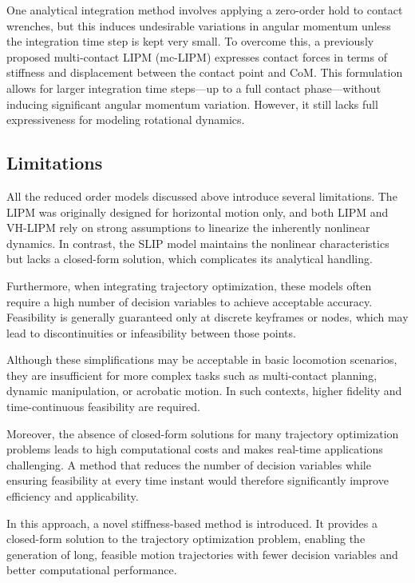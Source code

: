 \documentclass[main.tex]{subfiles}
\begin{document}
One analytical integration method involves applying a zero-order hold to contact wrenches, but this induces undesirable variations in angular momentum unless the integration time step is kept very small. To overcome this, a previously proposed multi-contact LIPM (mc-LIPM) expresses contact forces in terms of stiffness and displacement between the contact point and CoM. This formulation allows for larger integration time steps—up to a full contact phase—without inducing significant angular momentum variation. However, it still lacks full expressiveness for modeling rotational dynamics.



\subsection{Limitations}

All the reduced order models discussed above introduce several limitations. The LIPM was originally designed for horizontal motion only, and both LIPM and VH-LIPM rely on strong assumptions to linearize the inherently nonlinear dynamics. In contrast, the SLIP model maintains the nonlinear characteristics but lacks a closed-form solution, which complicates its analytical handling.

Furthermore, when integrating trajectory optimization, these models often require a high number of decision variables to achieve acceptable accuracy. Feasibility is generally guaranteed only at discrete keyframes or nodes, which may lead to discontinuities or infeasibility between those points.

Although these simplifications may be acceptable in basic locomotion scenarios, they are insufficient for more complex tasks such as multi-contact planning, dynamic manipulation, or acrobatic motion. In such contexts, higher fidelity and time-continuous feasibility are required.

Moreover, the absence of closed-form solutions for many trajectory optimization problems leads to high computational costs and makes real-time applications challenging. A method that reduces the number of decision variables while ensuring feasibility at every time instant would therefore significantly improve efficiency and applicability.

In this approach, a novel stiffness-based method is introduced. It provides a closed-form solution to the trajectory optimization problem, enabling the generation of long, feasible motion trajectories with fewer decision variables and better computational performance.
\end{document}
